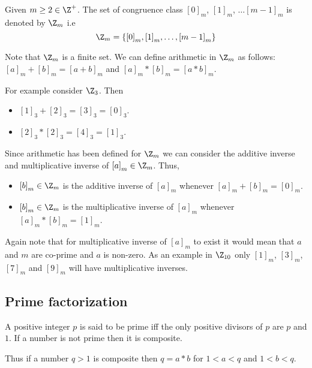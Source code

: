\begin{Definition}
    Given $m \geq 2 \in \Z^{+}$. The set of congruence class ${\left[0\right]}_m$,
    ${\left[1\right]}_m$, $\dots {\left[m-1\right]}_{m}$ is denoted by $\Z_{m}$ i.e 
    \begin{equation*}
	\Z_{m} = \lbrace {\left[0\right]}_m,{\left[1\right]}_m, \ldots, {\left[m-1\right]}_m \rbrace
    \end{equation*}
\end{Definition}

Note that $\Z_{m}$ is a finite set. We can define arithmetic in $\Z_{m}$ as follows:
$ {\left[a\right]}_m + {\left[b\right]}_m = {\left[a + b\right]}_m $ and 
$ {\left[a\right]}_m * {\left[b\right]}_m = {\left[a * b\right]}_m $.

For example consider $\Z_{3}$. Then 
\begin{itemize}
    \item $ {\left[1\right]}_3 +  {\left[2 \right]}_3  =  {\left[3\right]}_3 = 
	{\left[0\right]}_3 $.
    \item $ {\left[2 \right]}_3 * {\left[2 \right]}_3  = {\left[4 \right]}_3 = 
	{\left[1 \right]}_3 $.
\end{itemize}

Since arithmetic has been defined for $\Z_{m}$ we can consider the additive inverse and
multiplicative inverse of ${\left[a\right]}_m \in \Z_{m}$. Thus,
\begin{itemize}
    \item ${\left[b\right]}_m \in \Z_{m}$ is the additive inverse of ${\left[a\right]}_m$ whenever
	${\left[a\right]}_m + {\left[b\right]}_m = {\left[0\right]}_m$.
    \item ${\left[b\right]}_m \in \Z_{m}$ is the multiplicative inverse of ${\left[a\right]}_m$ whenever
	${\left[a\right]}_m * {\left[b\right]}_m = {\left[1\right]}_m$.
\end{itemize}

Again note that for multiplicative inverse of ${\left[a\right]}_m$ to exist it would mean that $a$
and $m$ are co-prime and $a$ is non-zero. As an example in $\Z_{10}$ only ${\left[1\right]}_m$, 
${\left[3\right]}_m$, ${\left[7\right]}_m$ and ${\left[9\right]}_m$ will have multiplicative
inverses.

\subsection{Prime factorization}
\begin{Definition}
    A positive integer $p$ is said to be prime iff the only positive divisors of $p$ are $p$ and
    $1$. If a number is not prime then it is composite.
\end{Definition}
Thus if a number $q > 1$ is composite then $q = a*b$ for $ 1 < a < q $ and $ 1 < b < q$.  

